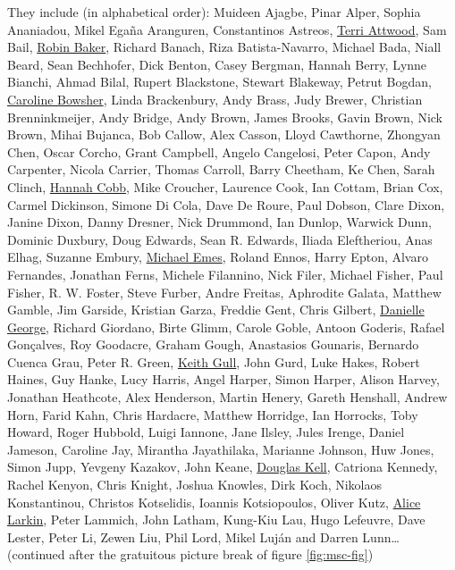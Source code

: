 \documentclass[
]{book}
\begin{document}
They include (in alphabetical order): Muideen Ajagbe, Pinar Alper, Sophia Ananiadou, Mikel Egaña Aranguren, Constantinos Astreos, \href{https://en.wikipedia.org/wiki/Terri_Attwood}{Terri Attwood}, Sam Bail, \href{https://en.wikipedia.org/wiki/Robin_Baker_(biologist)}{Robin Baker}, Richard Banach, Riza Batista-Navarro, Michael Bada, Niall Beard, Sean Bechhofer, Dick Benton, Casey Bergman, Hannah Berry, Lynne Bianchi, Ahmad Bilal, Rupert Blackstone, Stewart Blakeway, Petrut Bogdan, \href{https://www.advance-he.ac.uk/ntfs/professor-caroline-bowsher}{Caroline Bowsher}, Linda Brackenbury, Andy Brass, Judy Brewer, Christian Brenninkmeijer, Andy Bridge, Andy Brown, James Brooks, Gavin Brown, Nick Brown, Mihai Bujanca, Bob Callow, Alex Casson, Lloyd Cawthorne, Zhongyan Chen, Oscar Corcho, Grant Campbell, Angelo Cangelosi, Peter Capon, Andy Carpenter, Nicola Carrier, Thomas Carroll, Barry Cheetham, Ke Chen, Sarah Clinch, \href{https://en.wikipedia.org/wiki/Hannah_Cobb}{Hannah Cobb}, Mike Croucher, Laurence Cook, Ian Cottam, Brian Cox, Carmel Dickinson, Simone Di Cola, Dave De Roure, Paul Dobson, Clare Dixon, Janine Dixon, Danny Dresner, Nick Drummond, Ian Dunlop, Warwick Dunn, Dominic Duxbury, Doug Edwards, Sean R. Edwards, Iliada Eleftheriou, Anas Elhag, Suzanne Embury, \href{https://www.uoguelph.ca/mcb/people/dr-michael-j-emes}{Michael Emes}, Roland Ennos, Harry Epton, Alvaro Fernandes, Jonathan Ferns, Michele Filannino, Nick Filer, Michael Fisher, Paul Fisher, R. W. Foster, Steve Furber, Andre Freitas, Aphrodite Galata, Matthew Gamble, Jim Garside, Kristian Garza, Freddie Gent, Chris Gilbert, \href{https://en.wikipedia.org/wiki/Danielle_George}{Danielle George}, Richard Giordano, Birte Glimm, Carole Goble, Antoon Goderis, Rafael Gonçalves, Roy Goodacre, Graham Gough, Anastasios Gounaris, Bernardo Cuenca Grau, Peter R. Green, \href{https://en.wikipedia.org/wiki/Keith_Gull}{Keith Gull}, John Gurd, Luke Hakes, Robert Haines, Guy Hanke, Lucy Harris, Angel Harper, Simon Harper, Alison Harvey, Jonathan Heathcote, Alex Henderson, Martin Henery, Gareth Henshall, Andrew Horn, Farid Kahn, Chris Hardacre, Matthew Horridge, Ian Horrocks, Toby Howard, Roger Hubbold, Luigi Iannone, Jane Ilsley, Jules Irenge, Daniel Jameson, Caroline Jay, Mirantha Jayathilaka, Marianne Johnson, Huw Jones, Simon Jupp, Yevgeny Kazakov, John Keane, \href{https://en.wikipedia.org/wiki/Douglas_Kell}{Douglas Kell}, Catriona Kennedy, Rachel Kenyon, Chris Knight, Joshua Knowles, Dirk Koch, Nikolaos Konstantinou, Christos Kotselidis, Ioannis Kotsiopoulos, Oliver Kutz, \href{https://en.wikipedia.org/wiki/Alice_Larkin}{Alice Larkin}, Peter Lammich, John Latham, Kung-Kiu Lau, Hugo Lefeuvre, Dave Lester, Peter Li, Zewen Liu, Phil Lord, Mikel Luján and Darren Lunn\ldots{} (continued after the gratuitous picture break of figure \ref{fig:msc-fig})
\end{document}

